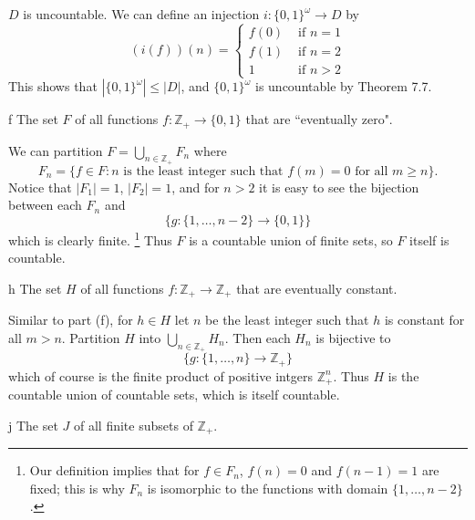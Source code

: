 \documentclass[11pt]{article}
\begin{document}
\begin{solution}
  $D$ is uncountable. We can define an injection $i: \{0,1\}^\omega \to D$ by
  \[ (i(f))(n) =
    \begin{cases}
      f(0) &\text{ if } n = 1 \\
      f(1) &\text{ if } n = 2 \\
      1    &\text{ if } n > 2
    \end{cases}
  \]
  This shows that $|\{0, 1\}^\omega| \leq |D|$, and $\{0, 1\}^\omega$ is
  uncountable by Theorem 7.7.
\end{solution}

\begin{p}{f}
  The set $F$ of all functions $f : \mathbb{Z}_+ \to \{0, 1\}$ that are
  ``eventually zero".
\end{p}

\begin{solution}
  We can partition $F = \bigcup_{n \in \mathbb{Z}_+} F_n$ where
  \[ F_n =
    \{ f \in F : n \text{ is the least integer such that } f(m) = 0 \text{ for
    all } m \geq n\}.
  \]
  Notice that $|F_1| = 1$, $|F_2| = 1$, and for $n > 2$ it is easy to see the
  bijection between each $F_n$ and
  \[ \{g : \{1,\ldots,n-2\} \to \{0, 1\}\} \]
  which is clearly finite.
  \footnote{Our definition implies that for $f \in F_n$,
    $f(n) = 0$ and $f(n-1) = 1$ are fixed; this is why $F_n$ is isomorphic to
  the functions with domain $\{1,\ldots,n-2\}$.}
  Thus $F$ is a countable union of finite sets, so $F$ itself is countable.
\end{solution}

\begin{p}{h}
  The set $H$ of all functions $f: \mathbb{Z}_+ \to \mathbb{Z}_+$ that are
  eventually constant.
\end{p}

\begin{solution}
  Similar to part (f), for $h \in H$ let $n$ be the least integer such that $h$
  is constant for all $m > n$. Partition $H$ into $\bigcup_{n \in \mathbb{Z}_+}
  H_n$. Then each $H_n$ is bijective to
  \[ \{g : \{1,\ldots,n\} \to \mathbb{Z}_+\} \]
  which of course is the finite product of positive intgers $\mathbb{Z}_+^n$.
  Thus $H$ is the countable union of countable sets, which is itself countable.
\end{solution}

\begin{p}{j}
  The set $J$ of all finite subsets of $\mathbb{Z}_+$.
\end{p}
\end{document}
